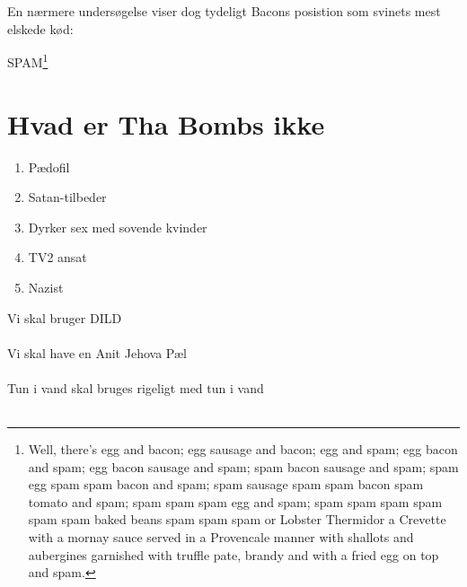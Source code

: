 En nærmere undersøgelse viser dog tydeligt Bacons posistion som svinets mest elskede kød:

SPAM\footnote{Well, there's egg and bacon; egg sausage and bacon; egg and spam; egg bacon and spam; egg bacon sausage and spam; spam bacon sausage and spam; spam egg spam spam bacon and spam; spam sausage spam spam bacon spam tomato and spam; spam spam spam egg and spam; spam spam spam spam spam spam baked beans spam spam spam or Lobster Thermidor a Crevette with a mornay sauce served in a Provencale manner with shallots and aubergines garnished with truffle pate, brandy and with a fried egg on top and spam.}



\section{Hvad er Tha Bombs ikke}
\begin{enumerate}
\item Pædofil \cite{bib:url:Finn:Pedo}
\item Satan-tilbeder \cite{bib:url:Finn:Satan}
\item Dyrker sex med sovende kvinder \cite{bib:url:Finn:SovendeKvinder}
\item TV2 ansat \cite{bib:url:Finn:TV2}
\item Nazist\cite{bib:url:Finn:Nazist}
\end{enumerate}


Vi skal bruger DILD\cite{bib:url:Reklame:Dild}
\\
\\
Vi skal have en Anit Jehova Pæl \cite{bib:url:Reklame:Anti}
\\
\\
Tun i vand skal bruges \cite{bib:url:Reklame:Tun} rigeligt med tun i vand
\\
\\



